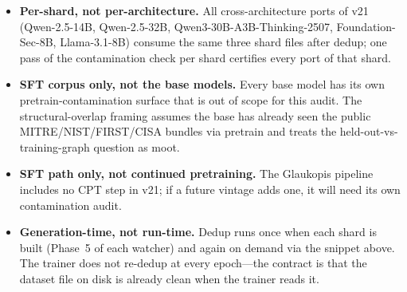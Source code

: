 \documentclass[conference]{IEEEtran}
\begin{document}
\begin{itemize}
  \item \textbf{Per-shard, not per-architecture.} All cross-architecture ports of v21 (Qwen-2.5-14B, Qwen-2.5-32B, Qwen3-30B-A3B-Thinking-2507, Foundation-Sec-8B, Llama-3.1-8B) consume the same three shard files after dedup; one pass of the contamination check per shard certifies every port of that shard.
  \item \textbf{SFT corpus only, not the base models.} Every base model has its own pretrain-contamination surface that is out of scope for this audit. The structural-overlap framing assumes the base has already seen the public MITRE/NIST/FIRST/CISA bundles via pretrain and treats the held-out-vs-training-graph question as moot.
  \item \textbf{SFT path only, not continued pretraining.} The Glaukopis pipeline includes no CPT step in v21; if a future vintage adds one, it will need its own contamination audit.
  \item \textbf{Generation-time, not run-time.} Dedup runs once when each shard is built (Phase~5 of each watcher) and again on demand via the snippet above. The trainer does not re-dedup at every epoch---the contract is that the dataset file on disk is already clean when the trainer reads it.
\end{itemize}




\end{document}
